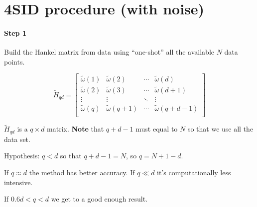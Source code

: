 \section{4SID procedure (with noise)}

\paragraph{Step 1} Build the Hankel matrix from data using ``one-shot'' all the available $N$ data points.

\[
    \tilde{H}_{qd} = \begin{bmatrix}
        \tilde{\omega}(1) & \tilde{\omega}(2) & \cdots & \tilde{\omega}(d) \\
        \tilde{\omega}(2) & \tilde{\omega}(3) & \cdots & \tilde{\omega}(d+1) \\
        \vdots            & \vdots            & \ddots & \vdots \\
        \tilde{\omega}(q) & \tilde{\omega}(q+1) & \cdots & \tilde{\omega}(q+d-1) \\
    \end{bmatrix}
\]

$\tilde{H}_{qd}$ is a $q\times d$ matrix. \textbf{Note} that $q+d-1$ must equal to $N$ so that we use all the data set.

\begin{remark}
    Hypothesis: $q<d$ so that $q+d-1=N$, so $q=N+1-d$.
    \begin{figure}[H]
        \centering
    \end{figure}

    If $q \approx d$ the method has better accuracy.
    If $q \ll d$ it's computationally less intensive.

    If $0.6d < q < d$ we get to a good enough result.
\end{remark}
